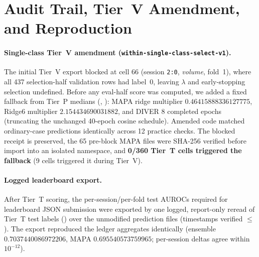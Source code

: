 \documentclass[11pt]{article}
\begin{document}
\appendix
\section{Audit Trail, Tier~V Amendment, and Reproduction}\label{app:audit}

\paragraph{Single-class Tier~V amendment (\texttt{within-single-class-select-v1}).}
The initial Tier~V export blocked at cell 66 (session \texttt{2:0}, \emph{volume}, fold~1), where all 437 selection-half validation rows had label~0, leaving $\lambda$ and early-stopping selection undefined. Before any eval-half score was computed, we added a fixed fallback from Tier~P medians (, ): MAPA ridge multiplier $0.46415888336127775$, Ridge6 multiplier $2.154434690031882$, and DIVER 8 completed epochs (truncating the unchanged 40-epoch cosine schedule). Amended code matched ordinary-case predictions identically across 12 practice checks. The blocked receipt is preserved, the 65 pre-block MAPA files were SHA-256 verified before import into an isolated namespace, and \textbf{0/360 Tier~T cells triggered the fallback} (9 cells triggered it during Tier~V).

\paragraph{Logged leaderboard export.}
After Tier~T scoring, the per-session/per-fold test AUROCs required for leaderboard JSON submission were exported by one logged, report-only reread of Tier~T test labels () over the unmodified prediction files (timestamps verified $\le$ ). The export reproduced the ledger aggregates identically (ensemble $0.7037440086972206$, MAPA $0.695540573759965$; per-session deltas agree within $10^{-12}$).
\end{document}

